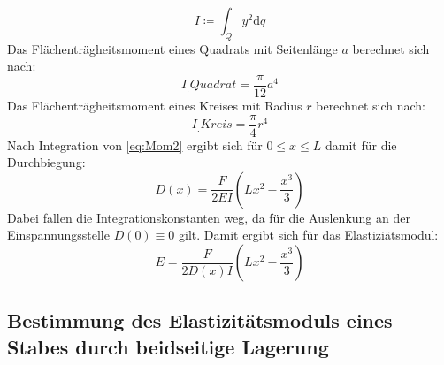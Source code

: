 \begin{equation}
I \coloneqq \int_Q y^2 \mathrm{d}q \label{eq:I}
\end{equation}
Das Flächenträgheitsmoment eines Quadrats mit Seitenlänge $a$ berechnet sich nach:
\begin{equation}
	I_.{Quadrat} = \frac{\pi}{12} a^4 \label{eq:I_Quadrat}
\end{equation}
Das Flächenträgheitsmoment eines Kreises mit Radius $r$ berechnet sich nach:
\begin{equation}
	I_.{Kreis} = \frac{\pi}{4} r^4 \label{eq:I_Kreis}
\end{equation}
Nach Integration von \eqref{eq:Mom2} ergibt sich für $0 \leq x \leq L$  damit für die Durchbiegung:
\begin{equation*}
D(x) = \frac{F}{2 E I}\left(L x^2 -\frac{x^3}{3}\right)
\end{equation*}
Dabei fallen die Integrationskonstanten weg, da für die Auslenkung an der Einspannungsstelle $D(0) \equiv 0$ gilt.
Damit ergibt sich für das Elastiziätsmodul:
\begin{equation}
E = \frac{F}{2 D(x) I}\left(L x^2 -\frac{x^3}{3}\right)\label{eq:E}
\end{equation}

\subsection{Bestimmung des Elastizitätsmoduls eines Stabes durch beidseitige Lagerung}

